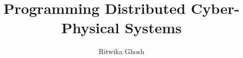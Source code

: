 \documentclass{llncs}
\begin{document}
%

\title{Programming Distributed Cyber-Physical Systems}
%
%
\author{Ritwika Ghosh}
%
%
%
\maketitle              %
%
%
%






%
%
% 
% 
%
\small


\end{document}
